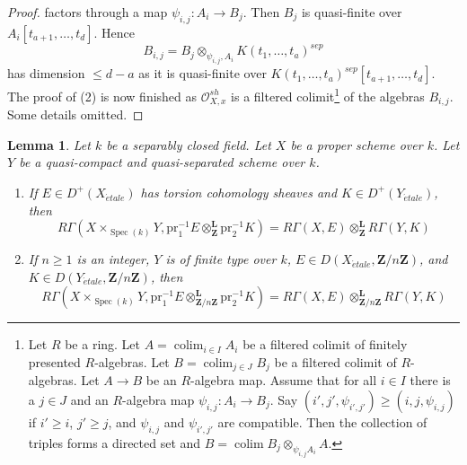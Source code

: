 \documentclass{amsart}
\theoremstyle{plain}
\newtheorem{lemma}[subsection]{Lemma}
\theoremstyle{definition}
\theoremstyle{remark}
\numberwithin{equation}{subsection}
\def\colim{\mathop{\mathrm{colim}}\nolimits}
\def\Spec{\mathop{\mathrm{Spec}}}
\def\etale{{\acute{e}tale}}
\begin{document}
\begin{proof}
factors through a map $\psi_{i, j} : A_i \to B_j$. Then $B_j$ is quasi-finite
over $A_i[t_{a + 1}, \ldots, t_d]$. Hence
$$
B_{i, j} = B_j \otimes_{\psi_{i, j}, A_i} K(t_1, \ldots, t_a)^{sep}
$$
has dimension $\leq d - a$ as it is quasi-finite over
$K(t_1, \ldots, t_a)^{sep}[t_{a + 1}, \ldots, t_d]$.
The proof of (2) is now finished as $\mathcal{O}_{X, x}^{sh}$ is a
filtered colimit\footnote{Let $R$ be a ring.
Let $A = \colim_{i \in I} A_i$
be a filtered colimit of finitely presented $R$-algebras.
Let $B = \colim_{j \in J} B_j$ be a filtered colimit of $R$-algebras.
Let $A \to B$ be an $R$-algebra map.
Assume that for all $i \in I$ there is a $j \in J$ and an $R$-algebra map
$\psi_{i, j} : A_i \to B_j$.
Say $(i', j', \psi_{i', j'}) \geq (i, j, \psi_{i, j})$ if
$i' \geq i$, $j' \geq j$, and $\psi_{i, j}$ and $\psi_{i', j'}$
are compatible. Then the collection of triples forms a
directed set and $B = \colim B_j \otimes_{\psi_{i, j} A_i} A$.}
of the algebras $B_{i, j}$. Some details omitted.
\end{proof}


\begin{lemma}
\label{lemma-kunneth-one-proper}
Let $k$ be a separably closed field. Let $X$ be a proper scheme over $k$.
Let $Y$ be a quasi-compact and quasi-separated scheme over $k$.
\begin{enumerate}
\item If $E \in D^+(X_\etale)$ has torsion cohomology sheaves and
$K \in D^+(Y_\etale)$, then
$$
R\Gamma(X \times_{\Spec(k)} Y,
\text{pr}_1^{-1}E
\otimes_\mathbf{Z}^\mathbf{L}
\text{pr}_2^{-1}K
)
=
R\Gamma(X, E)
\otimes_\mathbf{Z}^\mathbf{L}
R\Gamma(Y, K)
$$
\item If $n \geq 1$ is an integer, $Y$ is of finite type over $k$,
$E \in D(X_\etale, \mathbf{Z}/n\mathbf{Z})$, and
$K \in D(Y_\etale, \mathbf{Z}/n\mathbf{Z})$, then
$$
R\Gamma(X \times_{\Spec(k)} Y,
\text{pr}_1^{-1}E
\otimes_{\mathbf{Z}/n\mathbf{Z}}^\mathbf{L}
\text{pr}_2^{-1}K
)
=
R\Gamma(X, E)
\otimes_{\mathbf{Z}/n\mathbf{Z}}^\mathbf{L}
R\Gamma(Y, K)
$$
\end{enumerate}
\end{lemma}
\end{document}
